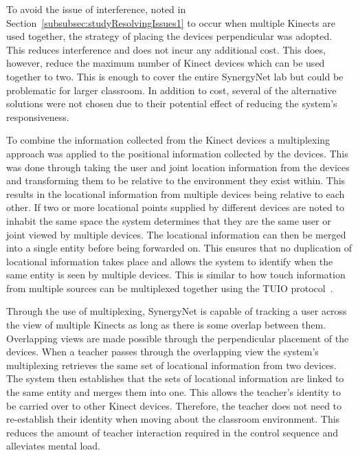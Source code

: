 \documentclass[link]{IWCOMP}
\begin{document}
To avoid the issue of interference, noted in Section~\ref{subsubsec:studyResolvingIssues1} to occur when multiple Kinects are used together, the strategy of placing the devices perpendicular was adopted.
This reduces interference and does not incur any additional cost.
This does, however, reduce the maximum number of Kinect devices which can be used together to two.
This is enough to cover the entire SynergyNet lab but could be problematic for larger classroom.
In addition to cost, several of the alternative solutions were not chosen due to their potential effect of reducing the system's responsiveness.

To combine the information collected from the Kinect devices a multiplexing approach was applied to the positional information collected by the devices.
This was done through taking the user and joint location information from the devices and transforming them to be relative to the environment they exist within.
This results in the locational information from multiple devices being relative to each other.
If two or more locational points supplied by different devices are noted to inhabit the same space the system determines that they are the same user or joint viewed by multiple devices.
The locational information can then be merged into a single entity before being forwarded on.
This ensures that no duplication of locational information takes place and allows the system to identify when the same entity is seen by multiple devices.
This is similar to how touch information from multiple sources can be multiplexed together using the TUIO protocol~\cite{Kaltenbrunner2009}.

Through the use of multiplexing, SynergyNet is capable of tracking a user across the view of multiple Kinects as long as there is some overlap between them.
Overlapping views are made possible through the perpendicular placement of the devices. 
When a teacher passes through the overlapping view the system's multiplexing retrieves the same set of locational information from two devices.
The system then establishes that the sets of locational information are linked to the same entity and merges them into one.
This allows the teacher's identity to be carried over to other Kinect devices.
Therefore, the teacher does not need to re-establish their identity when moving about the classroom environment.
This reduces the amount of teacher interaction required in the control sequence and alleviates mental load. 
\end{document}

